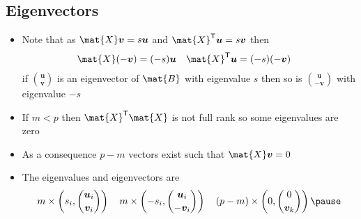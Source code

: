 
\begin{slide}
\section[-1]{Eigenvectors}

\begin{PauseHighLight}
  \begin{itemize}
  \item Note that as $\mat{X} \bm{v} = s \bm{u}$ and $\mat{X}^\tr
    \bm{u} = s \bm{v}$ then
    \begin{align*}
      \mat{X} (-\bm{v}) &= (-s) \bm{u}& 
      \mat{X}^\tr \bm{u} &= (-s) (-\bm{v})
    \end{align*}
    if $\binom{\bm{u}}{\bm{v}}$ is an eigenvector of $\mat{B}$ with
    eigenvalue $s$ then so is $\binom{\bm{u}}{-\bm{v}}$ 
    with eigenvalue $-s$\pause
  \item If $m<p$ then $\mat{X}^\tr\mat{X}$ is not full rank so some
    eigenvalues are zero\pause
  \item As a consequence $p-m$ vectors exist such that
    $\mat{X}\bm{v}=0$\pause
  \item The eigenvalues and eigenvectors are
    \begin{align*}
      m\times\left(s_i, \binom{\bm{u}_i}{\bm{v}_i}\right) \quad
      m\times\left(-s_i, \binom{\bm{u}_i}{-\bm{v}_i}\right) \quad
      (p-m)\times\left(0, \binom{0}{\bm{v}_k}\right) \pause
    \end{align*}
  \end{itemize}
\end{PauseHighLight}

\end{slide}


